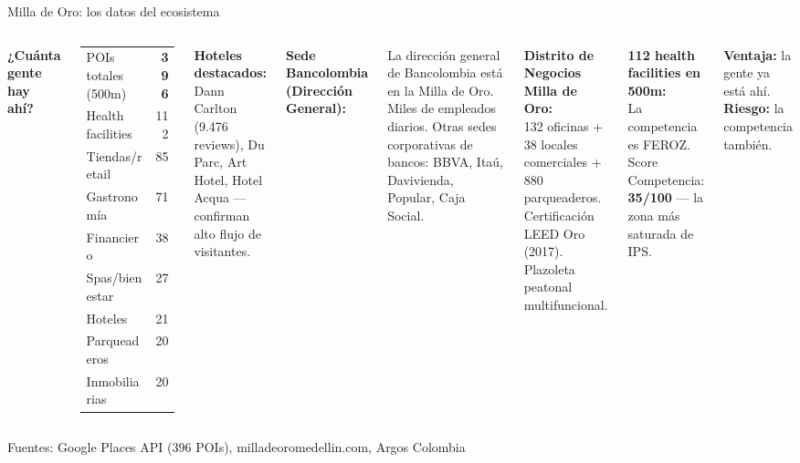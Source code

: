 \documentclass[aspectratio=169, 11pt]{beamer}
\begin{document}
\begin{frame}{Milla de Oro: los datos del ecosistema}

\begin{columns}[T]
\vspace{2pt}
{\scriptsize\textbf{¿Cuánta gente hay ahí?}}
\vspace{2pt}

{\scriptsize
\begin{tabular}{@{}lr@{}}
\toprule
POIs totales (500m) & \textbf{396} \\
Health facilities & 112 \\
Tiendas/retail & 85 \\
Gastronomía & 71 \\
Financiero & 38 \\
Spas/bienestar & 27 \\
Hoteles & 21 \\
Parqueaderos & 20 \\
Inmobiliarias & 20 \\
\bottomrule
\end{tabular}
}

\vspace{3pt}
{\scriptsize\textbf{Hoteles destacados:}\\
Dann Carlton (9.476 reviews), Du Parc, Art Hotel, Hotel Acqua --- confirman alto flujo de visitantes.}

\vspace{2pt}
{\scriptsize\textbf{Sede Bancolombia (Dirección General):}}
\vspace{2pt}

{\scriptsize La dirección general de Bancolombia está en la Milla de Oro. Miles de empleados diarios. Otras sedes corporativas de bancos: BBVA, Itaú, Davivienda, Popular, Caja Social.}

\vspace{4pt}
{\scriptsize\textbf{Distrito de Negocios Milla de Oro:}\\
132 oficinas + 38 locales comerciales + 880 parqueaderos. Certificación LEED Oro (2017). Plazoleta peatonal multifuncional.}

\vspace{4pt}
{\scriptsize\textbf{112 health facilities en 500m:}\\
La competencia es FEROZ. Score Competencia: \textcolor{comp}{\textbf{35/100}} --- la zona más saturada de IPS.}

\vspace{4pt}
{\scriptsize\textcolor{hptu}{\textbf{Ventaja:} la gente ya está ahí. \textbf{Riesgo:} la competencia también.}}
\end{columns}

{\tiny\color{slate} Fuentes: Google Places API (396 POIs), milladeoromedellin.com, Argos Colombia}
\end{frame}
\end{document}
